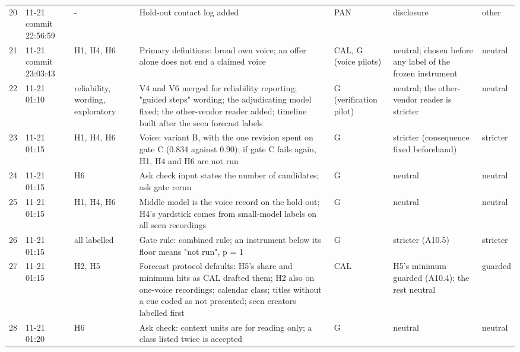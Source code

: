 {\begin{tabular}{@{}rp{}p{}p{}p{}p{}l@{}}
20 & 11-21 commit 22:56:59 & - & Hold-out contact log added & PAN & disclosure & other \\
21 & 11-21 commit 23:03:43 & H1, H4, H6 & Primary definitions: broad own voice; an offer alone does not end a claimed voice & CAL, G (voice pilots) & neutral; chosen before any label of the frozen instrument & neutral \\
22 & 11-21 01:10 & reliability, wording, exploratory & V4 and V6 merged for reliability reporting; "guided steps" wording; the adjudicating model fixed; the other-vendor reader added; timeline built after the seen forecast labels & G (verification pilot) & neutral; the other-vendor reader is stricter & neutral \\
23 & 11-21 01:15 & H1, H4, H6 & Voice: variant B, with the one revision spent on gate C (0.834 against 0.90); if gate C fails again, H1, H4 and H6 are not run & G & stricter (consequence fixed beforehand) & stricter \\
24 & 11-21 01:15 & H6 & Ask check input states the number of candidates; ask gate rerun & G & neutral & neutral \\
25 & 11-21 01:15 & H1, H4, H6 & Middle model is the voice record on the hold-out; H4's yardstick comes from small-model labels on all seen recordings & G & neutral & neutral \\
26 & 11-21 01:15 & all labelled & Gate rule: combined rule; an instrument below its floor means "not run", p = 1 & G & stricter (A10.5) & stricter \\
27 & 11-21 01:15 & H2, H5 & Forecast protocol defaults: H5's share and minimum hits as CAL drafted them; H2 also on one-voice recordings; calendar class; titles without a cue coded as not presented; seen creators labelled first & CAL & H5's minimum guarded (A10.4); the rest neutral & guarded \\
28 & 11-21 01:20 & H6 & Ask check: context units are for reading only; a class listed twice is accepted & G & neutral & neutral \\
\bottomrule
\end{tabular}}
